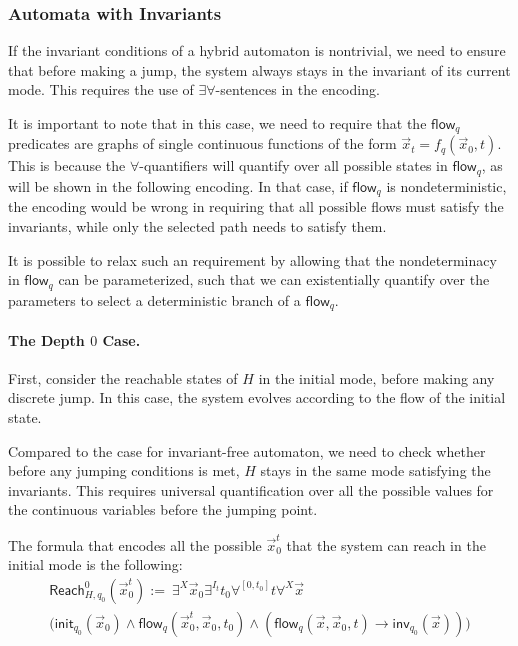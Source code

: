 \documentclass[envcountsect]{llncs}
\newcommand{\flow}{\mathsf{flow}}
\newcommand{\inv}{\mathsf{inv}}
\newcommand{\init}{\mathsf{init}}
\newcommand{\reach}{\mathsf{Reach}}
\begin{document}
\subsubsection{Automata with Invariants}\label{auto_inv}

If the invariant conditions of a hybrid automaton is nontrivial, we need to
ensure that before making a jump, the system always stays in the invariant of
its current mode. This requires the use of $\exists\forall$-sentences in the
encoding.

\begin{remark}
It is important to note that in this case, we need to require that the
$\flow_q$ predicates are graphs of single continuous functions of the form $\vec
x_t = f_q(\vec x_0, t)$. This is because the $\forall$-quantifiers will quantify
over all possible states in $\flow_q$, as will be shown in the following
encoding. In that case, if $\flow_q$ is nondeterministic, the encoding would be
wrong in requiring that all possible flows must satisfy the invariants, while
only the selected path needs to satisfy them.

It is possible to relax such an requirement by allowing that the nondeterminacy
in $\flow_q$ can be parameterized, such that we can existentially quantify over
the parameters to select a deterministic branch of a $\flow_q$.
\end{remark}
\paragraph{The Depth $0$ Case.} First, consider the reachable states of $H$ in
the initial mode, before making any discrete jump. In this case, the system
evolves according to the flow of the initial state.

Compared to the case for invariant-free automaton, we need to check whether
before any jumping conditions is met, $H$ stays in the same mode satisfying the
invariants. This requires universal quantification over all the possible values
for the continuous variables before the jumping point.

The formula that encodes all the possible $\vec x_0^t$ that the system can
reach in the initial mode is the following:
\begin{multline*}
\reach^0_{H,q_0} (\vec x_0^t):=\ \exists^X \vec x_0 \exists^{I_t}
t_0\forall^{[0,t_0]} t\forall^X \vec x\\ \Big(\init_{q_0}(\vec x_0)\wedge
\flow_q(\vec x_0^t, \vec x_0, t_0)\wedge (\flow_q(\vec x, \vec x_0,
t)\rightarrow\inv_{q_0}(\vec x))\Big)
\end{multline*}
\end{document}
